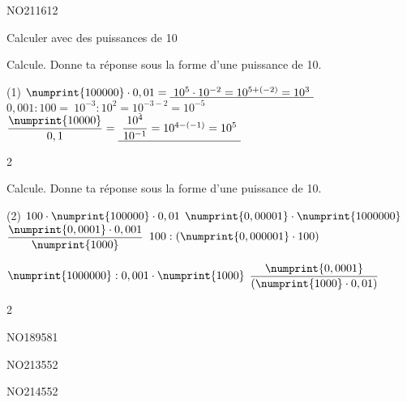\documentclass[a4paper,11pt]{report}
\begin{document}
\begin{exof}{NO211}{61}{2} %
\end{exof}

\begin{resolu}{Calculer avec des puissances de 10}{
Calcule. Donne ta réponse sous la forme d'une puissance de 10.

     \begin{tasks}(1)
         \task $\numprint{100000}\cdot0,01=\underline{~10^5\cdot10^{-2}=10^{5+(-2)}=10^3~}$
         \task $0,001:100=\underline{~10^{-3}:10^2=10^{-3-2}=10^{-5}~}$
         \task $\dfrac{\numprint{10000}}{0,1}=\underline{~\dfrac{10^4}{10^{-1}}=10^{4-(-1)}=10^5~}$
     \end{tasks}

}{2}    
\end{resolu}

\begin{exo}{
    Calcule. Donne ta réponse sous la forme d'une puissance de 10.

     \begin{tasks}(2)
         \task $100\cdot\numprint{100000}\cdot0,01$
         \task $\numprint{0,00001}\cdot\numprint{1000000}$
         \task $\dfrac{\numprint{0,0001}\cdot0,001}{\numprint{1000}}$
         \task $100:(\numprint{0,000001}\cdot100)$
         
         \task $\numprint{1000000}:0,001\cdot\numprint{1000}$
         \task $\dfrac{\numprint{0,0001}}{(\numprint{1000}\cdot0,01)}$
     \end{tasks}
}{2}
\end{exo}


\begin{exof}{NO189}{58}{1} %
\end{exof}

\begin{exol}{NO213}{55}{2} %
\end{exol}

\begin{exol}{NO214}{55}{2} %
\end{exol}



\end{document}
